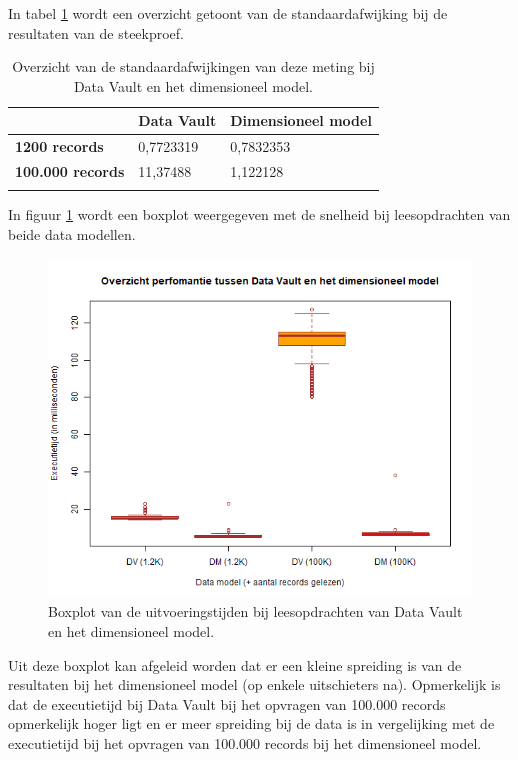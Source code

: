 In tabel \ref{tab:sa} wordt een overzicht getoont van de standaardafwijking bij de resultaten van de steekproef.

\begin{center}
	\renewcommand{\arraystretch}{2}%
	\begin{longtable}{  l  p{}  p{} }
		\ & \textbf{Data Vault} & \textbf{Dimensioneel model} \\ \hline
		\textbf{1200 records} & 0,7723319 & 0,7832353 \\
		\textbf{100.000 records} & 11,37488 & 1,122128 \\
		\caption{Overzicht van de standaardafwijkingen van deze meting bij Data Vault en het dimensioneel model.}
		\label{tab:sa}
	\end{longtable}
\end{center}



In figuur \ref{fig:boxplotperf} wordt een boxplot weergegeven met de snelheid bij leesopdrachten van beide data modellen. 

\begin{figure}[h]
	\centering
	\includegraphics[scale=0.7]{../images/Score_perf.png}
	\caption{Boxplot van de uitvoeringstijden bij leesopdrachten van Data Vault en het dimensioneel model. }
	\label{fig:boxplotperf}
\end{figure}

Uit deze boxplot kan afgeleid worden dat er een kleine spreiding is van de resultaten bij het dimensioneel model (op enkele uitschieters na). Opmerkelijk is dat de executietijd bij Data Vault bij het opvragen van 100.000 records opmerkelijk hoger ligt en er meer spreiding bij de data is in vergelijking met de executietijd bij het opvragen van 100.000 records bij het dimensioneel model.

